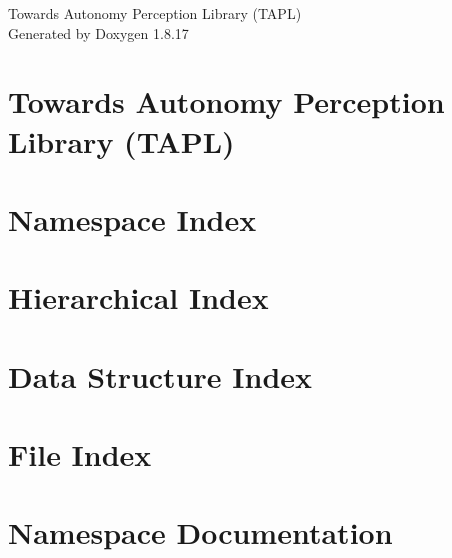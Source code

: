 \let\mypdfximage\pdfximage\def\pdfximage{\immediate\mypdfximage}\documentclass[twoside]{book}
\newcommand{\+}{\discretionary{\mbox{\scriptsize$\hookleftarrow$}}{}{}}
\newcommand{\clearemptydoublepage}{%
  \newpage{\pagestyle{empty}\cleardoublepage}%
}
\begin{document}
\hypersetup{pageanchor=false,
             bookmarksnumbered=true,
             pdfencoding=unicode
            }
\begin{titlepage}
\vspace*{7cm}
\begin{center}%
{\Large Towards Autonomy Perception Library (T\+A\+PL) }\\
\vspace*{1cm}
{\large Generated by Doxygen 1.8.17}\\
\end{center}
\end{titlepage}
\clearemptydoublepage
{}
\tableofcontents
\clearemptydoublepage
{}
\hypersetup{pageanchor=true}

\chapter{Towards Autonomy Perception Library (T\+A\+PL)}
\label{index}\hypertarget{index}{}
\chapter{Namespace Index}

\chapter{Hierarchical Index}

\chapter{Data Structure Index}

\chapter{File Index}

\chapter{Namespace Documentation}







\end{document}
